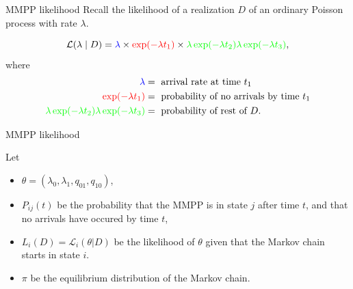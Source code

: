 \documentclass{beamer}
\begin{document}
\begin{frame}{MMPP likelihood}
    Recall the likelihood of a realization $D$ of an ordinary Poisson
    process with rate $\lambda$.

    \begin{center}
    \end{center}
    \[
        \mathcal{L}(\lambda \mid D) = \color{blue}\lambda\color{black} \times 
        \color{red}\exp(-\lambda t_1)\color{black} \times
        \color{green}\lambda \exp(-\lambda t_2) \lambda \exp(-\lambda t_3)\color{black},
    \]
    \pause
    where
    \begin{align*}
        \color{blue}\lambda &= \text{ arrival rate at time } t_1 \\
        \color{red}\exp(-\lambda t_1) &= \text{ probability of no arrivals by time } t_1 \\
        \color{green}\lambda \exp(-\lambda t_2) \lambda \exp(-\lambda t_3) &= \text{ probability of rest of } D.
    \end{align*}
\end{frame}

\begin{frame}{MMPP likelihood}
    \begin{center}\end{center}
    \vspace{-1cm}
    Let 
    \begin{itemize}
        \item $\theta = (\lambda_0, \lambda_1, q_{01}, q_{10})$,
            \pause
        \item $P_{ij}(t)$ be the probability that the MMPP is in state $j$
            after time $t$, and that no arrivals have occured by time $t$,
            \pause
        \item $L_i(D) = \mathcal{L}_i(\theta | D)$ be the likelihood of
            $\theta$ given that the Markov chain starts in state $i$.
            \pause
        \item $\pi$ be the equilibrium distribution of the Markov chain.
    \end{itemize}
\end{frame}
\end{document}
